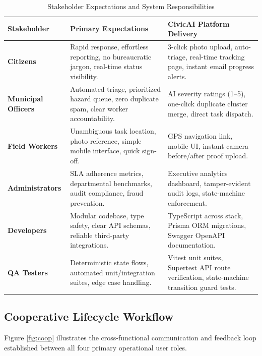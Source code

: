 \documentclass[11pt,a4paper]{article}
\begin{document}
\begin{table}[H]
\centering
\footnotesize
\caption{Stakeholder Expectations and System Responsibilities}
\begin{tabularx}{\textwidth}{l X X}
\toprule
\textbf{Stakeholder} & \textbf{Primary Expectations} & \textbf{CivicAI Platform Delivery} \\
\midrule
\textbf{Citizens} & Rapid response, effortless reporting, no bureaucratic jargon, real-time status visibility. & 3-click photo upload, auto-triage, real-time tracking page, instant email progress alerts. \\
\textbf{Municipal Officers} & Automated triage, prioritized hazard queue, zero duplicate spam, clear worker accountability. & AI severity ratings (1--5), one-click duplicate cluster merge, direct task dispatch. \\
\textbf{Field Workers} & Unambiguous task location, photo reference, simple mobile interface, quick sign-off. & GPS navigation link, mobile UI, instant camera before/after proof upload. \\
\textbf{Administrators} & SLA adherence metrics, departmental benchmarks, audit compliance, fraud prevention. & Executive analytics dashboard, tamper-evident audit logs, state-machine enforcement. \\
\textbf{Developers} & Modular codebase, type safety, clear API schemas, reliable third-party integrations. & TypeScript across stack, Prisma ORM migrations, Swagger OpenAPI documentation. \\
\textbf{QA Testers} & Deterministic state flows, automated unit/integration suites, edge case handling. & Vitest unit suites, Supertest API route verification, state-machine transition guard tests. \\
\bottomrule
\end{tabularx}
\end{table}

\subsection{Cooperative Lifecycle Workflow}
Figure \ref{fig:coop} illustrates the cross-functional communication and feedback loop established between all four primary operational user roles.
\end{document}
